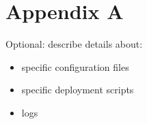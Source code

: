 %
%
%
\chapter{\label{chap:appendix}Appendix A}

Optional: describe details about:
\begin{itemize}
    \item specific configuration files
    \item specific deployment scripts
    \item logs
\end{itemize}
